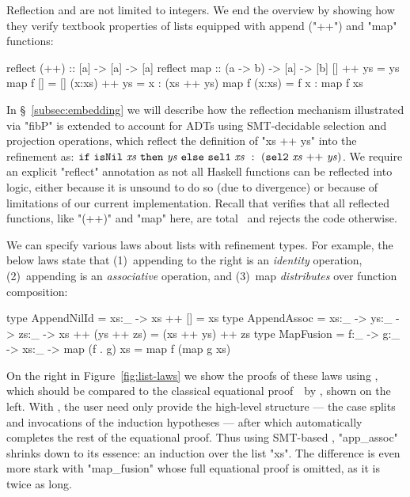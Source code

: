Reflection and \pbesym are not limited to integers.  We end the
overview by showing how they verify textbook properties of lists
equipped with append ("++") and "map" functions:
%
\begin{mcode}
    reflect (++) :: [a] -> [a] -> [a]       reflect map :: (a -> b) -> [a] -> [b]
    []     ++ ys = ys                       map f []     = []
    (x:xs) ++ ys = x : (xs ++ ys)           map f (x:xs) = f x : map f xs
\end{mcode}
%
In \S~\ref{subsec:embedding}
we will describe how the reflection mechanism
illustrated via "fibP" is extended to account for ADTs
using SMT-decidable selection and projection operations,
which reflect the definition of "xs ++ ys" into the refinement as:
%
$\ite{\mathtt{isNil}\ \mathit{xs}}
    {\mathit{ys}}
    {\mathtt{sel1}\ \mathit{xs}\
      \dcons\
      (\mathtt{sel2}\ \mathit{xs} \ \mathtt{++}\  \mathit{ys})}$.
%
%
We require an explicit "reflect" annotation
as not all Haskell functions can be 
reflected into logic, either because it 
is unsound to do so (\eg due to divergence)
or because of limitations of our current 
implementation. 
%
Recall that \toolname verifies that all reflected functions, 
like "(++)" and "map" here, are total~\citep{Vazou14}
and rejects the code otherwise.

%
We can specify various laws about lists with refinement types.
For example, the below laws state that
%
(1)~appending to the right is an \emph{identity} operation,
%
(2)~appending is an \emph{associative} operation, and
%
(3)~map \emph{distributes} over function composition:
%
\begin{mcode}
    type AppendNilId = xs:_ -> { xs ++ [] = xs }
    type AppendAssoc = xs:_ -> ys:_ -> zs:_ -> { xs ++ (ys ++ zs) = (xs ++ ys) ++ zs }
    type MapFusion   = f:_  -> g:_  -> xs:_ -> { map (f . g) xs = map f (map g xs) }
\end{mcode}

%
On the right in Figure~\ref{fig:list-laws}
we show the proofs of these laws using \pbesym,
which should be compared to the classical equational
proof~\eg~by \citet{WadlerCalculating}, shown on the left.
%
With \pbesym, the user need only
provide the high-level structure
--- the case splits and invocations
of the induction hypotheses ---
after which \pbesym automatically
completes the rest of the equational
proof.
%
Thus using SMT-based \pbesym, "app_assoc"
shrinks down to its essence: an induction
over the list "xs".
%
The difference is even more stark with
"map_fusion" whose full equational proof
is omitted, as it is twice as long.

